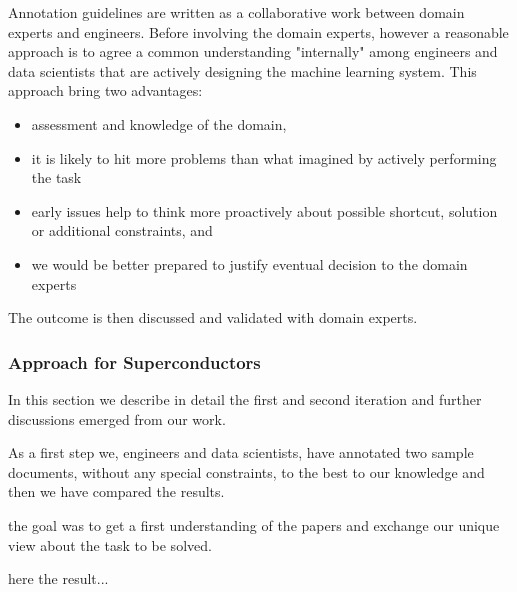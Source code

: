 \documentclass{article}
\begin{document}
Annotation guidelines are written as a collaborative work between domain experts and engineers. Before involving the domain experts, however a reasonable approach is to agree a common understanding "internally" among engineers and data scientists that are actively designing the machine learning system. 
This approach bring two advantages: 
\begin{itemize}
    \item assessment and knowledge of the domain, 
    \item it is likely to hit more problems than what imagined by actively performing the task 
    \item early issues help to think more proactively about possible shortcut, solution or additional constraints, and 
    \item we would be better prepared to justify eventual decision to the domain experts
\end{itemize}

The outcome is then discussed and validated with domain experts. 

\subsubsection{Approach for Superconductors}
In this section we describe in detail the first and second iteration and further discussions emerged from our work.

As a first step we, engineers and data scientists, have annotated two sample documents, without any special constraints, to the best to our knowledge and then we have compared the results. 

the goal was to get a first understanding of the papers and exchange our unique view about the task to be solved. 

here the result...
\end{document}
